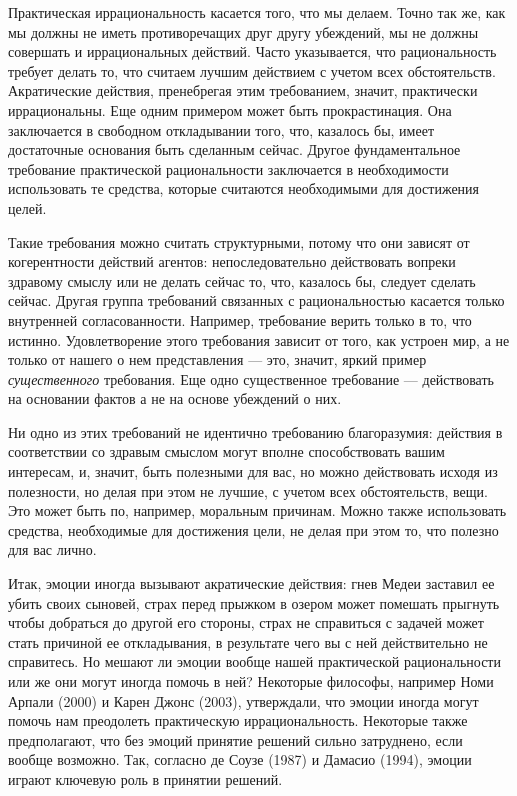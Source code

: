 \documentclass[11pt]{book}
\begin{document}
Практическая иррациональность касается того, что мы делаем. Точно так же, как мы должны не иметь противоречащих друг другу убеждений, мы не должны совершать и иррациональных действий. Часто указывается, что рациональность требует делать то, что считаем лучшим действием с учетом всех обстоятельств. Акратические действия, пренебрегая этим требованием, значит, практически иррациональны. Еще одним примером может быть прокрастинация. Она заключается в свободном откладывании того, что, казалось бы, имеет достаточные основания быть сделанным сейчас. Другое фундаментальное требование практической рациональности заключается в необходимости использовать те средства, которые считаются необходимыми для достижения целей.

Такие требования можно считать структурными, потому что они зависят от когерентности действий агентов: непоследовательно действовать вопреки здравому смыслу или не делать сейчас то, что, казалось бы, следует сделать сейчас. Другая группа требований связанных с рациональностью касается только внутренней согласованности. Например, требование верить только в то, что истинно. Удовлетворение этого требования зависит от того, как устроен мир, а не только от нашего о нем представления --- это, значит, яркий пример \textit{существенного} требования. Еще одно существенное требование --- действовать на основании фактов а не на основе убеждений о них.

Ни одно из этих требований не идентично требованию благоразумия: действия в соответствии со здравым смыслом могут вполне способствовать вашим интересам, и, значит, быть полезными для вас, но можно действовать исходя из полезности, но делая при этом не лучшие, с учетом всех обстоятельств, вещи. Это может быть по, например, моральным причинам. Можно также использовать средства, необходимые для достижения цели, не делая при этом то, что полезно для вас лично.

Итак, эмоции иногда вызывают акратические действия: гнев Медеи заставил ее убить своих сыновей, страх перед прыжком в озером может помешать прыгнуть чтобы добраться до другой его стороны, страх не справиться с задачей может стать причиной ее откладывания, в результате чего вы с ней действительно не справитесь. Но мешают ли эмоции вообще нашей практической рациональности или же они могут иногда помочь в ней? Некоторые философы, например Номи Арпали (2000) и Карен Джонс (2003), утверждали, что эмоции иногда могут помочь нам преодолеть практическую иррациональность. Некоторые также предполагают, что без эмоций принятие решений сильно затруднено, если вообще возможно. Так, согласно де Соузе (1987) и Дамасио (1994), эмоции играют ключевую роль в принятии решений.
\end{document}
